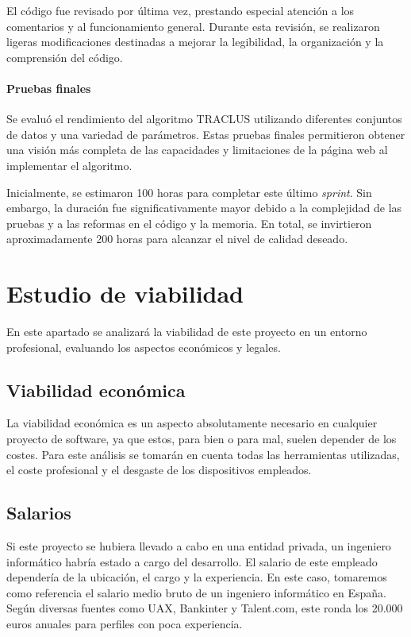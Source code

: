 El código fue revisado por última vez, prestando especial atención a los comentarios y al funcionamiento general. Durante esta revisión, se realizaron ligeras modificaciones destinadas a mejorar la legibilidad, la organización y la comprensión del código.

\paragraph{Pruebas finales}

Se evaluó el rendimiento del algoritmo TRACLUS utilizando diferentes conjuntos de datos y una variedad de parámetros. Estas pruebas finales permitieron obtener una visión más completa de las capacidades y limitaciones de la página web al implementar el algoritmo.

Inicialmente, se estimaron 100 horas para completar este último \textit{sprint}. Sin embargo, la duración fue significativamente mayor debido a la complejidad de las pruebas y a las reformas en el código y la memoria. En total, se invirtieron aproximadamente 200 horas para alcanzar el nivel de calidad deseado.

\section{Estudio de viabilidad}

En este apartado se analizará la viabilidad de este proyecto en un entorno profesional, evaluando los aspectos económicos y legales.

\subsection{Viabilidad económica}

La viabilidad económica es un aspecto absolutamente necesario en cualquier proyecto de software, ya que estos, para bien o para mal, suelen depender de los costes. Para este análisis se tomarán en cuenta todas las herramientas utilizadas, el coste profesional y el desgaste de los dispositivos empleados.

\subsection{Salarios}

Si este proyecto se hubiera llevado a cabo en una entidad privada, un ingeniero informático habría estado a cargo del desarrollo. El salario de este empleado dependería de la ubicación, el cargo y la experiencia. En este caso, tomaremos como referencia el salario medio bruto de un ingeniero informático en España. Según diversas fuentes como UAX, Bankinter y Talent.com, este ronda los 20.000 euros anuales para perfiles con poca experiencia.

